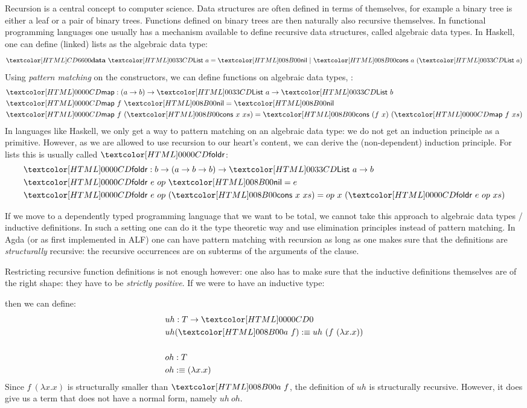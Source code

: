 Recursion is a central concept to computer science. Data structures
are often defined in terms of themselves, for example a binary tree is
either a leaf or a pair of binary trees. Functions defined on binary
trees are then naturally also recursive themselves. In functional
programming languages one usually has a mechanism available to define
recursive data structures, called algebraic data types. In Haskell,
one can define (linked) lists as the algebraic data type:
$$
\data\ \List\ a = \listnil\ |\ \listcons\ a\ (\List\ a)
$$
Using \emph{pattern matching} on the constructors, we can define
functions on algebraic data types, \eg:
\begin{align*}
  &\listmap : (a \to b) \to \List\ a \to \List\ b \\
  &\listmap\ f\ \listnil = \listnil \\
  &\listmap\ f\ (\listcons\ x\ xs) = \listcons\ (f\ x)\ (\listmap\ f\ xs)
\end{align*}
In languages like Haskell, we only get a way to pattern matching on an
algebraic data type: we do not get an induction principle as a
primitive. However, as we are allowed to use recursion to our heart's
content, we can derive the (non-dependent) induction principle. For
lists this is usually called $\listfoldr$:
\begin{align*}
  &\listfoldr : b \to (a \to b \to b) \to \List\ a \to b \\
  &\listfoldr\ e\ op\ \listnil = e \\
  &\listfoldr\ e\ op\ (\listcons\ x\ xs) = op\ x\ (\listfoldr\ e\ op\ xs)
\end{align*}

If we move to a dependently typed programming language that we want to
be total, we cannot take this approach to algebraic data types /
inductive definitions. In such a setting one can do it the type
theoretic way and use elimination principles instead of pattern
matching.  In Agda (or as first implemented in ALF) one can have
pattern matching with recursion as long as one makes sure that the
definitions are \emph{structurally} recursive: the recursive
occurrences are on subterms of the arguments of the clause.

Restricting recursive function definitions is not enough however: one
also has to make sure that the inductive definitions themselves are of
the right shape: they have to be \emph{strictly positive}. If we were
to have an inductive type:
\begin{datatype}{\Tty}{\Type}
  \constr{\Ta}{(\Tty \to \Tty)}{\Tty}
\end{datatype}
then we can define:
\begin{align*}
  &uh : T \to \emptyty \\
  &uh (\Ta\ f) \ddefeq uh\ (f\ (\lambda x . x)) \\
  \\
  &oh : T \\
  &oh \ddefeq (\lambda x . x)
\end{align*}
Since $f\ (\lambda x . x)$ is structurally smaller than $\Ta\ f$, the
definition of $uh$ is structurally recursive. However, it does give us
a term that does not have a normal form, namely $uh\ oh$.

